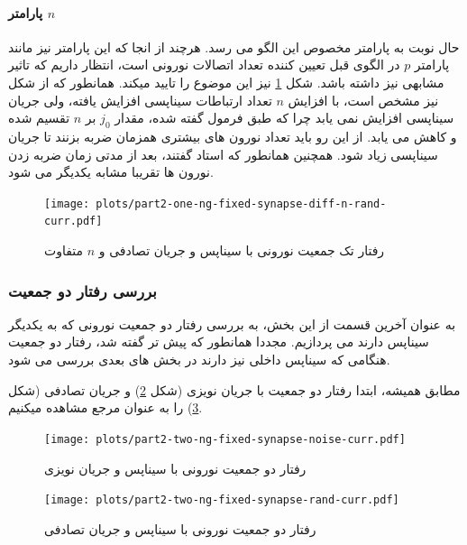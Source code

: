             \paragraph*{پارامتر $n$}
            حال نوبت به پارامتر مخصوص این الگو می رسد. هرچند از انجا که این پارامتر نیز مانند پارامتر 
            $p$ 
            در الگوی قبل تعیین کننده تعداد اتصالات نورونی است، انتظار داریم که تاثیر مشابهی نیز داشته باشد. شکل
            \ref{fig:part2-one-ng-fixed-synapse-diff-n-rand-curr}
            نیز این موضوع را تایید میکند. همانطور که از شکل نیز مشخص است، با افزایش 
            $n$ 
            تعداد ارتباطات سیناپسی افزایش یافته، ولی جریان سیناپسی افزایش نمی یابد چرا که طبق فرمول گفته شده، مقدار 
            $j_0$ 
            بر 
            $n$ 
            تقسیم شده و کاهش می یابد. از این رو باید تعداد نورون های بیشتری همزمان ضربه بزنند تا جریان سیناپسی زیاد شود. همچنین همانطور که استاد گفتند، بعد از مدتی زمان ضربه زدن نورون ها تقریبا مشابه یکدیگر می شود.
            \begin{figure}[!ht]
                \centering
                \texttt{[image: plots/part2-one-ng-fixed-synapse-diff-n-rand-curr.pdf]} 
                \caption{رفتار تک جمعیت نورونی با سیناپس و جریان تصادفی و $n$ متفاوت}
                \label{fig:part2-one-ng-fixed-synapse-diff-n-rand-curr}
            \end{figure}

        \subsubsection*{بررسی رفتار دو جمعیت}
            به عنوان آخرین قسمت از این بخش، به بررسی رفتار دو جمعیت نورونی که به یکدیگر سیناپس دارند می پردازیم. مجددا همانطور که پیش تر گفته شد، رفتار دو جمعیت هنگامی که سیناپس داخلی نیز دارند در بخش های بعدی بررسی می شود.

            مطابق همیشه، ابتدا رفتار دو جمعیت با جریان نویزی
            (شکل \ref{fig:part2-two-ng-fixed-synapse-noise-curr})
            و جریان تصادفی
            (شکل \ref{fig:part2-two-ng-fixed-synapse-rand-curr})
            را به عنوان مرجع مشاهده میکنیم.
            \begin{figure}[!ht]
                \centering
                \texttt{[image: plots/part2-two-ng-fixed-synapse-noise-curr.pdf]} 
                \caption{رفتار دو جمعیت نورونی با سیناپس و جریان نویزی}
                \label{fig:part2-two-ng-fixed-synapse-noise-curr}
            \end{figure}
            \begin{figure}[!ht]
                \centering
                \texttt{[image: plots/part2-two-ng-fixed-synapse-rand-curr.pdf]} 
                \caption{رفتار دو جمعیت نورونی با سیناپس و جریان تصادفی}
                \label{fig:part2-two-ng-fixed-synapse-rand-curr}
            \end{figure}

